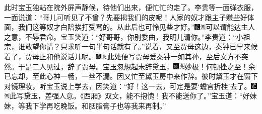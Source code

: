 此时宝玉独站在院外屏声静候，待他们出来，便忙忙的走了。李贵等一面弹衣服，一面说道：``哥儿可听见了不曾？先要揭我们的皮呢！人家的奴才跟主子赚些好体面，我们这等奴才白陪挨打受骂的。从此后也可怜见些才好。''{\includegraphics[width=3mm]{../Images/00006}\includegraphics[width=3mm]{../Images/00011}\footnotesize \kaishu 可以谓能达主人之意，不辱君命。}宝玉笑道：``好哥哥，你别委曲，我明儿请你。''李贵道：``小祖宗，谁敢望你请？只求听一句半句话就有了。''说着，又至贾母这边，秦钟已早来候着了，贾母正和他说话儿呢。{\includegraphics[width=3mm]{../Images/00005}\includegraphics[width=3mm]{../Images/00012}\footnotesize \kaishu 此处便写贾母爱秦钟一如其孙，至后文方不突然。}于是二人见过，辞了贾母。宝玉忽想起未辞黛玉，{\includegraphics[width=3mm]{../Images/00005}\includegraphics[width=3mm]{../Images/00012}\footnotesize \kaishu 妙极！何顿挫之至！余已忘却，至此心神一畅，一丝不漏。}因又忙至黛玉房中来作辞。彼时黛玉才在窗下对镜理妆，听宝玉说上学去，因笑道：``好！这一去，可定是要`蟾宫折桂'去了。{\includegraphics[width=3mm]{../Images/00006}\includegraphics[width=3mm]{../Images/00011}\footnotesize \kaishu 此写黛玉，差强人意。《西厢》双文，能不抱愧！}我不能送你了。''宝玉道：``好妹妹，等我下学再吃晚饭。和胭脂膏子也等我来再制。''
